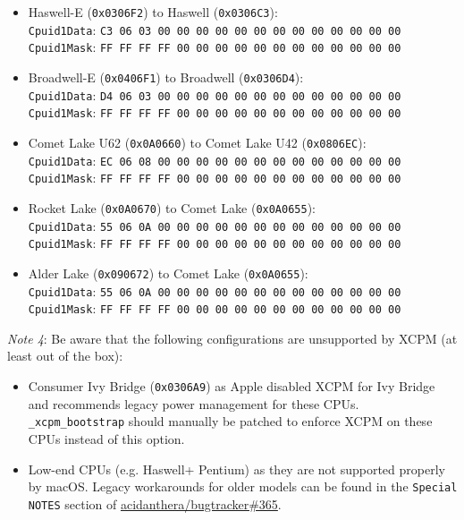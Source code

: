 \documentclass[]{article}
\providecommand{\tightlist}{%
  \setlength{\itemsep}{0pt}\setlength{\parskip}{0pt}}
\begin{document}
\begin{enumerate}
  \begin{itemize}
    \tightlist
    \item Haswell-E (\texttt{0x0306F2}) to Haswell (\texttt{0x0306C3}):\\
    \texttt{Cpuid1Data}: \texttt{C3 06 03 00 00 00 00 00 00 00 00 00 00 00 00 00}\\
    \texttt{Cpuid1Mask}: \texttt{FF FF FF FF 00 00 00 00 00 00 00 00 00 00 00 00}
    \item Broadwell-E (\texttt{0x0406F1}) to Broadwell (\texttt{0x0306D4}):\\
    \texttt{Cpuid1Data}: \texttt{D4 06 03 00 00 00 00 00 00 00 00 00 00 00 00 00}\\
    \texttt{Cpuid1Mask}: \texttt{FF FF FF FF 00 00 00 00 00 00 00 00 00 00 00 00}
    \item Comet Lake U62 (\texttt{0x0A0660}) to Comet Lake U42 (\texttt{0x0806EC}):\\
    \texttt{Cpuid1Data}: \texttt{EC 06 08 00 00 00 00 00 00 00 00 00 00 00 00 00}\\
    \texttt{Cpuid1Mask}: \texttt{FF FF FF FF 00 00 00 00 00 00 00 00 00 00 00 00}
    \item Rocket Lake (\texttt{0x0A0670}) to Comet Lake (\texttt{0x0A0655}):\\
    \texttt{Cpuid1Data}: \texttt{55 06 0A 00 00 00 00 00 00 00 00 00 00 00 00 00}\\
    \texttt{Cpuid1Mask}: \texttt{FF FF FF FF 00 00 00 00 00 00 00 00 00 00 00 00}
    \item Alder Lake (\texttt{0x090672}) to Comet Lake (\texttt{0x0A0655}):\\
    \texttt{Cpuid1Data}: \texttt{55 06 0A 00 00 00 00 00 00 00 00 00 00 00 00 00}\\
    \texttt{Cpuid1Mask}: \texttt{FF FF FF FF 00 00 00 00 00 00 00 00 00 00 00 00}
  \end{itemize}

  \emph{Note 4}: Be aware that the following configurations are unsupported by XCPM (at least out of the box):

  \begin{itemize}
    \tightlist
    \item Consumer Ivy Bridge (\texttt{0x0306A9}) as Apple disabled XCPM for Ivy Bridge
      and recommends legacy power management for these CPUs. \texttt{\_xcpm\_bootstrap}
      should manually be patched to enforce XCPM on these CPUs instead of this option.
    \item Low-end CPUs (e.g. Haswell+ Pentium) as they are not supported properly by macOS.
      Legacy workarounds for older models can be found in the \texttt{Special NOTES} section of
      \href{https://github.com/acidanthera/bugtracker/issues/365}{acidanthera/bugtracker\#365}.
  \end{itemize}


\end{enumerate}
\end{document}
